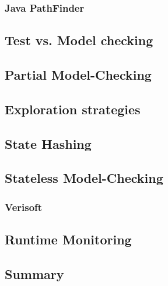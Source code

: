 \documentclass[12pt, a4paper]{book}
\begin{document}
  \subsubsection{Java PathFinder}
  \label{subs:Java PathFinder}
  \subsection{Test vs. Model checking}
  \label{sub:Test vs. Model checking}
  \subsection{Partial Model-Checking}
  \label{sub:Partial Model-Checking}
  \subsection{Exploration strategies}
  \label{sub:Exploration strategies}
  \subsection{State Hashing}
  \label{sub:State Hashing}
  \subsection{Stateless Model-Checking}
  \label{sub:Stateless Model-Checking}
  \subsubsection{Verisoft}
  \label{subs:Verisoft}
  \subsection{Runtime Monitoring}
  \label{sub:Runtime Monitoring}
  \subsection{Summary}
  \label{sub:Summary}
\end{document}

